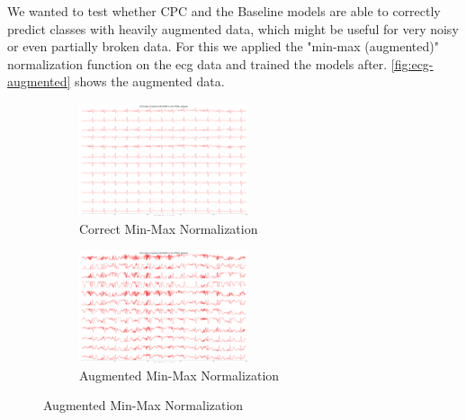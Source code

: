 We wanted to test whether CPC and the Baseline models are able to correctly predict classes with heavily augmented data, which might be useful for very noisy or even partially broken data. For this we applied the "min-max (augmented)" normalization function on the ecg data and trained the models after. \autoref{fig:ecg-augmented} shows the augmented data.
\begin{figure}[h]
	\caption{Normalized ECG example from beginning \autoref{fig:ECGBasic}}
	\begin{subfigure}[t]{0.48\textwidth}\centering
		\includegraphics[width=1\linewidth]{bilder/ecg-example-minmax0.png}%
		\caption{Correct Min-Max Normalization}
	\end{subfigure}%
	\hfill	
	\begin{subfigure}[t]{0.48\textwidth}\centering
		\includegraphics[width=1\linewidth]{bilder/ecg-example-augmented0.png}%
		\caption{Augmented Min-Max Normalization}
	\end{subfigure}
	\label{fig:ecg-augmented}
\end{figure}

